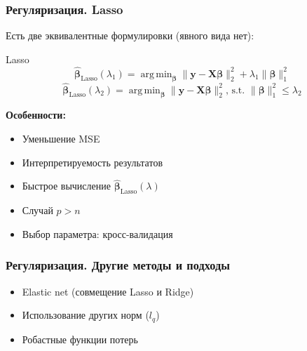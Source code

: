 \documentclass[ucs, notheorems, handout]{beamer}
\DeclareMathOperator*{\argmin}{arg\,min}
\newcommand{\betah}{\hat{\bm \beta}}
\newcommand{\betaa}{\bm{\beta}}
\newcommand{\X}{\bm{X}}
\begin{document}
\begin{frame}
    \frametitle{Регуляризация. Lasso}
Есть две эквивалентные формулировки (явного вида нет):
\begin{block}{Lasso}
$$\betah_{\text{Lasso}}(\lambda_1) = \argmin_{\betaa}{\|\bm y - \X\betaa\|^2_2 +\lambda_1 \|\betaa\|^2_1}
$$
$$
\betah_{\text{Lasso}}(\lambda_2) = \argmin_{\betaa}{\|\bm y - \X\betaa\|^2_2 \text{, s.t. } \|\betaa\|^2_1 \leqslant \lambda_2}
$$
\end{block}	
\textbf{
Особенности:
}
\begin{itemize}
	\item Уменьшение MSE
	\item Интерпретируемость результатов
	\item Быстрое вычисление $\betah_\text{Lasso}(\lambda)$
	\item Случай $p>n$
	\item Выбор параметра: кросс-валидация
\end{itemize}
    \note{
    }
\end{frame}

\begin{frame}
    \frametitle{Регуляризация. Другие методы и подходы}

\begin{itemize}
	\item Elastic net (совмещение Lasso и Ridge)
	\item Использование других норм ($l_q$)
	\item Робастные функции потерь
\end{itemize}
    \note{
	
    }
\end{frame}
\end{document}
